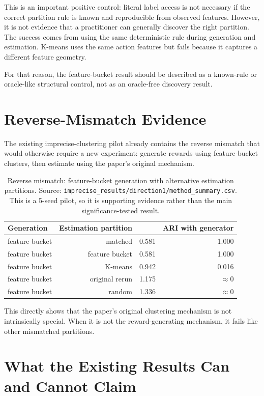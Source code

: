 \documentclass[11pt]{article}
\newcommand{\relMSE}{\mathrm{relMSE}}
\begin{document}
This is an important positive control: literal label access is not necessary if
the correct partition rule is known and reproducible from observed features.
However, it is not evidence that a practitioner can generally discover the
right partition. The success comes from using the same deterministic rule during
generation and estimation. K-means uses the same action features but fails
because it captures a different feature geometry.

For that reason, the feature-bucket result should be described as a known-rule
or oracle-like structural control, not as an oracle-free discovery result.

\section{Reverse-Mismatch Evidence}

The existing imprecise-clustering pilot already contains the reverse mismatch
that would otherwise require a new experiment: generate rewards using
feature-bucket clusters, then estimate using the paper's original mechanism.

\begin{table}[h]
\centering
\caption{Reverse mismatch: feature-bucket generation with alternative estimation
partitions. Source: \texttt{imprecise_results/direction1/method_summary.csv}.
This is a 5-seed pilot, so it is supporting evidence rather than the main
significance-tested result.}
\begin{tabular}{lrrr}
\toprule
Generation & Estimation partition & \relMSE{} & ARI with generator \\
\midrule
feature bucket & matched & 0.581 & 1.000 \\
feature bucket & feature bucket & 0.581 & 1.000 \\
feature bucket & K-means & 0.942 & 0.016 \\
feature bucket & original rerun & 1.175 & $\approx 0$ \\
feature bucket & random & 1.336 & $\approx 0$ \\
\bottomrule
\end{tabular}
\end{table}

This directly shows that the paper's original clustering mechanism is not
intrinsically special. When it is not the reward-generating mechanism, it fails
like other mismatched partitions.

\section{What the Existing Results Can and Cannot Claim}
\end{document}
